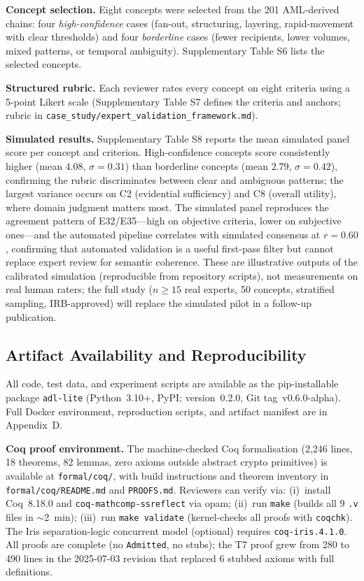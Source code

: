 \textbf{Concept selection.} Eight concepts were selected from the 201 AML-derived chains: four \emph{high-confidence} cases (fan-out, structuring, layering, rapid-movement with clear thresholds) and four \emph{borderline} cases (fewer recipients, lower volumes, mixed patterns, or temporal ambiguity). Supplementary Table S6 lists the selected concepts.

\textbf{Structured rubric.} Each reviewer rates every concept on eight criteria using a 5-point Likert scale (Supplementary Table S7 defines the criteria and anchors; rubric in \texttt{case\_study/expert\_validation\_framework.md}).

\textbf{Simulated results.} Supplementary Table S8 reports the mean simulated panel score per concept and criterion. High-confidence concepts score consistently higher (mean $4.08$, $\sigma = 0.31$) than borderline concepts (mean $2.79$, $\sigma = 0.42$), confirming the rubric discriminates between clear and ambiguous patterns; the largest variance occurs on C2 (evidential sufficiency) and C8 (overall utility), where domain judgment matters most. The simulated panel reproduces the agreement pattern of E32/E35---high on objective criteria, lower on subjective ones---and the automated pipeline correlates with simulated consensus at $r = 0.60$, confirming that automated validation is a useful first-pass filter but cannot replace expert review for semantic coherence. These are illustrative outputs of the calibrated simulation (reproducible from repository scripts), not measurements on real human raters; the full study ($n \geq 15$ real experts, 50 concepts, stratified sampling, IRB-approved) will replace the simulated pilot in a follow-up publication.

\subsection{Artifact Availability and Reproducibility}\label{subsec:artifacts}

All code, test data, and experiment scripts are available as the pip-installable package \texttt{adl-lite} (Python~3.10+, PyPI; version~0.2.0, Git tag~v0.6.0-alpha). Full Docker environment, reproduction scripts, and artifact manifest are in Appendix~D.

\textbf{Coq proof environment.} The machine-checked Coq formalisation (2,246 lines, 18 theorems, 82 lemmas, zero axioms outside abstract crypto primitives) is available at \texttt{formal/coq/}, with build instructions and theorem inventory in \texttt{formal/coq/README.md} and \texttt{PROOFS.md}. Reviewers can verify via: (i)~install Coq~8.18.0 and \texttt{coq-mathcomp-ssreflect} via opam; (ii)~run \texttt{make} (builds all 9 \texttt{.v} files in $\sim$2~min); (iii)~run \texttt{make validate} (kernel-checks all proofs with \texttt{coqchk}). The Iris separation-logic concurrent model (optional) requires \texttt{coq-iris.4.1.0}. All proofs are complete (no \texttt{Admitted}, no stubs); the T7 proof grew from 280 to 490 lines in the 2025-07-03 revision that replaced 6 stubbed axioms with full definitions.

